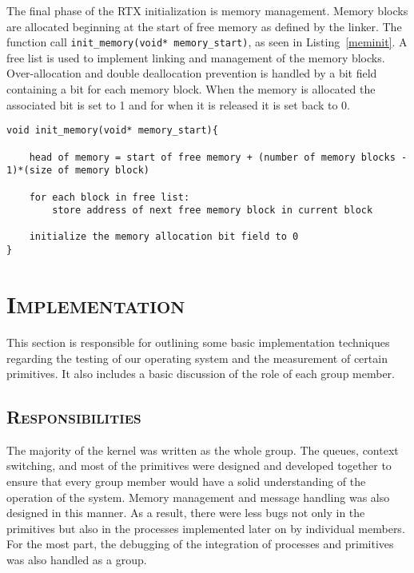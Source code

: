 \documentclass[oneside]{report}
\begin{document}
The final phase of the RTX initialization is memory management.  Memory blocks
are allocated beginning at the start of free memory as defined by the linker.
The function call \texttt{init\_memory(void* memory\_start)}, as seen in
Listing~\ref{meminit}. A free list is used to implement linking and management
of the memory blocks. Over-allocation and double deallocation prevention is
handled by a bit field containing a bit for each memory block. When the memory
is allocated the associated bit is set to 1 and for when it is released it is
set back to 0.

\begin{lstlisting}
void init_memory(void* memory_start){
    
    head of memory = start of free memory + (number of memory blocks - 1)*(size of memory block)
    
    for each block in free list:
        store address of next free memory block in current block

    initialize the memory allocation bit field to 0
}
\end{lstlisting}

\pagebreak 

\section{\textsc{Implementation}}
\label{sec:implementation}
This section is responsible for outlining some basic implementation techniques 
regarding the testing of our operating system and the measurement of certain 
primitives. It also includes a basic discussion of the role of each group member. 
 
\subsection{\textsc{Responsibilities}}
The majority of the kernel was written as the whole group. The queues, context
switching, and most of the primitives were designed and developed together to 
ensure that every group member would have a solid understanding of the operation 
of the system. Memory management and message handling was also designed in this
manner. As a result, there were less bugs not only in the primitives but also
in the processes implemented later on by individual members. For the most part,
the debugging of the integration of processes and primitives was also handled as 
a group.
\end{document}
